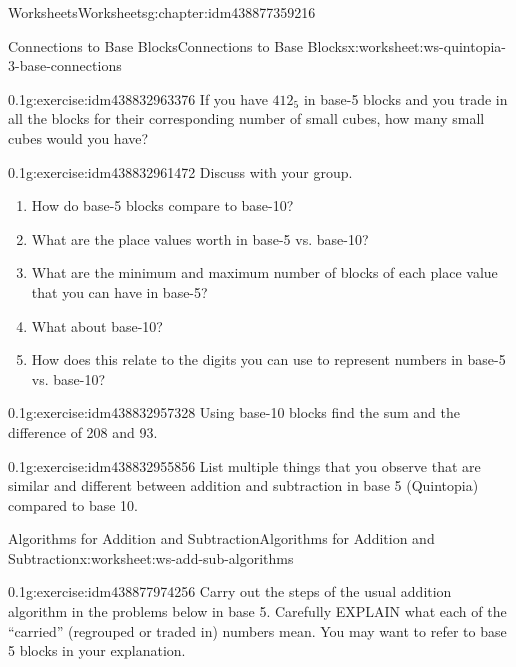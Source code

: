 \documentclass[twoside,11pt,]{book}
\begin{document}
\begin{chapterptx}{Worksheets}{}{Worksheets}{}{}{g:chapter:idm438877359216}
\begin{worksheet-section-numberless}{Connections to Base Blocks}{}{Connections to Base Blocks}{}{}{x:worksheet:ws-quintopia-3-base-connections}
\begin{divisionexercise}{2}{}{0.1}{g:exercise:idm438832963376}%
If you have \(412_{5}\) in base-5 blocks and you trade in all the blocks for their corresponding number of small cubes, how many small cubes would you have?%
\end{divisionexercise}%
\begin{divisionexercise}{3}{}{0.1}{g:exercise:idm438832961472}%
Discuss with your group.%
\leavevmode%
\begin{enumerate}[label=(\alph*)]
\item{}How do base-5 blocks compare to base-10?%
\item{}What are the place values worth in base-5 vs. base-10?%
\item{}What are the minimum and maximum number of blocks of each place value that you can have in base-5?%
\item{}What about base-10?%
\item{}How does this relate to the digits you can use to represent numbers in base-5 vs. base-10?%
\end{enumerate}
\end{divisionexercise}%
\begin{divisionexercise}{4}{}{0.1}{g:exercise:idm438832957328}%
Using base-10 blocks find the sum and the difference of 208 and 93.%
\end{divisionexercise}%
\begin{divisionexercise}{5}{}{0.1}{g:exercise:idm438832955856}%
List multiple things that you observe that are similar and different between addition and subtraction in base 5 (Quintopia) compared to base 10.%
\end{divisionexercise}%
\end{worksheet-section-numberless}
\restoregeometry
%
%
\typeout{************************************************}
\typeout{************************************************}
%
\begin{worksheet-section-numberless}{Algorithms for Addition and Subtraction}{}{Algorithms for Addition and Subtraction}{}{}{x:worksheet:ws-add-sub-algorithms}
\begin{divisionexercise}{1}{}{0.1}{g:exercise:idm438877974256}%
Carry out the steps of the usual addition algorithm in the problems below in base 5.  Carefully EXPLAIN what each of the ``carried'' (regrouped or traded in) numbers mean.  You may want to refer to base 5 blocks in your explanation.%

\end{divisionexercise}
\end{worksheet-section-numberless}
\end{chapterptx}
\end{document}
